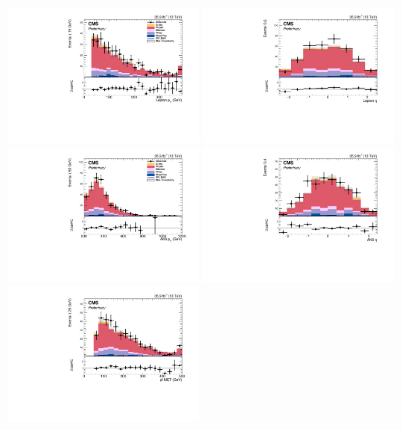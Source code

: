 \begin{figure}[!htbp]
\centering
\includegraphics[width=0.45\textwidth]{Plots/plots/DibosonBoostedElMuCuts13TeV_WjetControlRegion_Tighter_CHS_lepton_pt.pdf}
\includegraphics[width=0.45\textwidth]{Plots/plots/DibosonBoostedElMuCuts13TeV_WjetControlRegion_Tighter_CHS_lepton_eta.pdf}
\includegraphics[width=0.45\textwidth]{Plots/plots/DibosonBoostedElMuCuts13TeV_WjetControlRegion_Tighter_CHS_ungroomed_PuppiAK8_jet_pt.pdf}
\includegraphics[width=0.45\textwidth]{Plots/plots/DibosonBoostedElMuCuts13TeV_WjetControlRegion_Tighter_CHS_ungroomed_PuppiAK8_jet_eta.pdf}
\includegraphics[width=0.45\textwidth]{Plots/plots/DibosonBoostedElMuCuts13TeV_WjetControlRegion_Tighter_CHS_pfMET_Corr.pdf}

\end{figure}
